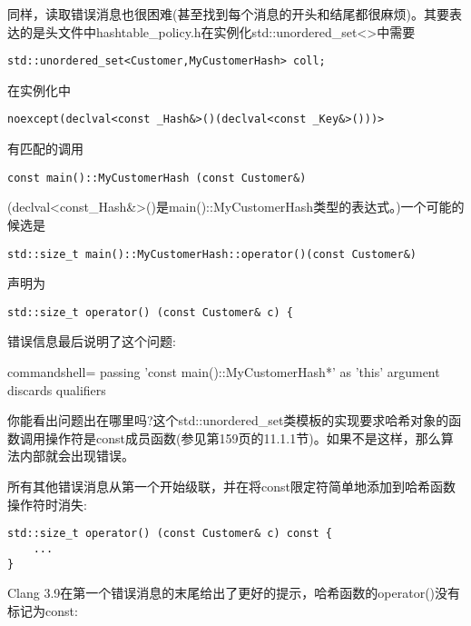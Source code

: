 同样，读取错误消息也很困难(甚至找到每个消息的开头和结尾都很麻烦)。其要表达的是头文件中hashtable\_policy.h在实例化std::unordered\_set<>中需要

\begin{lstlisting}[style=styleCXX]
std::unordered_set<Customer,MyCustomerHash> coll;
\end{lstlisting}

在实例化中

\begin{lstlisting}[style=styleCXX]
noexcept(declval<const _Hash&>()(declval<const _Key&>()))>
\end{lstlisting}

有匹配的调用

\begin{lstlisting}[style=styleCXX]
const main()::MyCustomerHash (const Customer&)
\end{lstlisting}

(declval<const\_Hash\&>()是main()::MyCustomerHash类型的表达式。)一个可能的候选是

\begin{lstlisting}[style=styleCXX]
std::size_t main()::MyCustomerHash::operator()(const Customer&)
\end{lstlisting}

声明为

\begin{lstlisting}[style=styleCXX]
std::size_t operator() (const Customer& c) {
\end{lstlisting}

错误信息最后说明了这个问题:

{\scriptsize
\begin{tcblisting}{commandshell={}}
passing ’const main()::MyCustomerHash*’ as ’this’ argument discards qualifiers
\end{tcblisting}
}

你能看出问题出在哪里吗?这个std::unordered\_set类模板的实现要求哈希对象的函数调用操作符是const成员函数(参见第159页的11.1.1节)。如果不是这样，那么算法内部就会出现错误。

所有其他错误消息从第一个开始级联，并在将const限定符简单地添加到哈希函数操作符时消失:

\begin{lstlisting}[style=styleCXX]
std::size_t operator() (const Customer& c) const {
	...
}
\end{lstlisting}

Clang 3.9在第一个错误消息的末尾给出了更好的提示，哈希函数的operator()没有标记为const:

